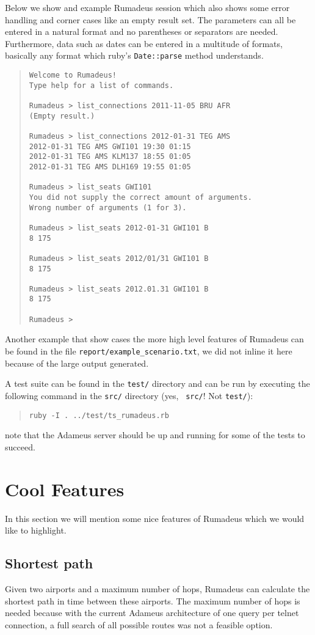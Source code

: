 \documentclass[11pt,pdftex,oneside]{article}
\begin{document}
Below we show and example Rumadeus session which also shows some error
handling and corner cases like an empty result set.
The parameters can all be entered in a natural format and no parentheses
or separators are needed.
Furthermore, data such as dates can be entered in a multitude of formats,
basically any format which ruby's {\tt Date::parse} method
understands.
\begin{samepage}
  \begin{quote}
    \begin{verbatim}
Welcome to Rumadeus!
Type help for a list of commands.

Rumadeus > list_connections 2011-11-05 BRU AFR
(Empty result.)

Rumadeus > list_connections 2012-01-31 TEG AMS
2012-01-31 TEG AMS GWI101 19:30 01:15
2012-01-31 TEG AMS KLM137 18:55 01:05
2012-01-31 TEG AMS DLH169 19:55 01:05

Rumadeus > list_seats GWI101
You did not supply the correct amount of arguments.
Wrong number of arguments (1 for 3).

Rumadeus > list_seats 2012-01-31 GWI101 B
8 175

Rumadeus > list_seats 2012/01/31 GWI101 B
8 175

Rumadeus > list_seats 2012.01.31 GWI101 B
8 175

Rumadeus >
    \end{verbatim}
  \end{quote}
\end{samepage}
Another example that show cases the more high level features of Rumadeus
can be found in the file {\tt report/example\_scenario.txt}, we did not
inline it here because of the large output generated.

A test suite can be found in the {\tt test/} directory and can be run by
executing the following command in the {\tt src/} directory (yes, {\tt
src/}! Not {\tt test/}):
\begin{quote}
  {\tt ruby -I . ../test/ts\_rumadeus.rb}
\end{quote}
note that the Adameus server should be up and running for some of the
tests to succeed.

\section{Cool Features}
In this section we will mention some nice features of Rumadeus which we
would like to highlight.

\subsection{Shortest path}
Given two airports and a maximum number of hops, Rumadeus can calculate
the shortest path in time between these airports.
The maximum number of hops is needed because with the current Adameus
architecture of one query per telnet connection, a full search of all
possible routes was not a feasible option.
\end{document}
